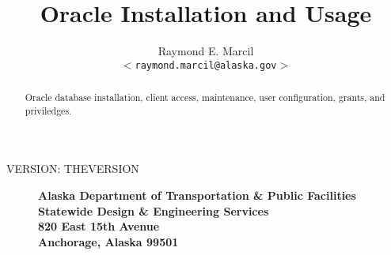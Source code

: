 \documentclass[12pt,letterpaper,dvips]{article}
\title{Oracle Installation and Usage}
\author{Raymond E. Marcil\\
        \texttt{$<$raymond.marcil@alaska.gov$>$}
}
\begin{document}
\maketitle

\begin{center}VERSION: THEVERSION\end{center} 


\begin{abstract}
  \noindent Oracle database installation, client access, maintenance,
  user configuration, grants, and priviledges.
\end{abstract}

\vspace{2.5in}

\begin{figure}[h]
        \hspace{0.32in}
        \begin{minipage}[b]{0.16\figwidth}
        \end{minipage}
        \hspace{5pt}
        \begin{minipage}[b]{\figwidth}
                \bf{Alaska Department of Transportation \& Public Facilities}\\
                \bf{Statewide Design \& Engineering Services}\\
                820 East 15th Avenue\\
                Anchorage, Alaska 99501
        \end{minipage}
\end{figure}

\vspace{2.0in}

\newpage
\tableofcontents

\newpage













\end{document}

